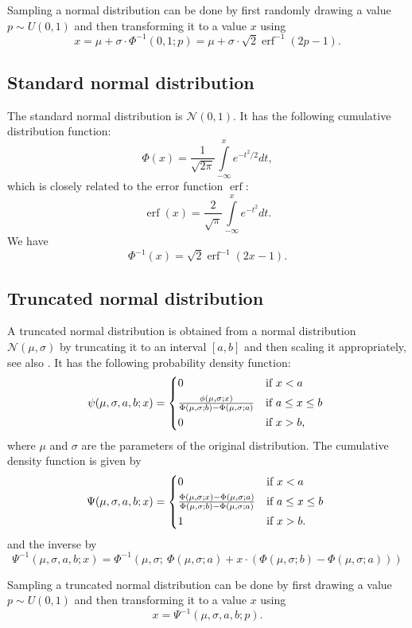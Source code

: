 \documentclass{article}
\DeclareMathOperator\erf{erf}
\begin{document}
\vspace{0.5cm}
\noindent
Sampling a normal distribution can be done by first randomly drawing a value $p \sim U(0,1)$ and then transforming it to a value $x$ using
\[
x = \mu + \sigma \cdot \Phi^{-1}(0,1; p) = \mu + \sigma \cdot \sqrt{2} \erf^{-1}(2p - 1).
\]

\subsection{Standard normal distribution}
The standard normal distribution is $\mathcal{N}(0,1)$. It has the following cumulative distribution function:
\[
\Phi(x) = \frac{1}{\sqrt{2 \pi}} 
\int\limits_{-\infty}^x e^{-t^2 / 2} dt,
\]
which is closely related to the error function $\erf$:
\[
\erf(x) = \frac{2}{\sqrt{\pi}} 
\int\limits_{-\infty}^x e^{-t^2} dt.
\]
We have
\[
\Phi^{-1}(x) = \sqrt{2} \erf^{-1}(2x-1).
\]

\subsection{Truncated normal distribution}
A truncated normal distribution is obtained from a normal distribution $\mathcal{N}(\mu,\sigma)$ by truncating it to an interval $[a,b]$ and then scaling it appropriately, see also \cite{Burkardt2014}. It has the following probability density function:
\[
\psi(\mu,\sigma,a,b;x) =
\begin{cases*}
0 & if $x < a$ \\
\frac{\phi(\mu,\sigma;x)}{\Phi(\mu,\sigma;b) - \Phi(\mu,\sigma;a)} & if $a \leq x \leq b$ \\
0 & if $x > b$,
\end{cases*}
\]
where $\mu$ and $\sigma$ are the parameters of the original distribution. The cumulative density function is given by
\[
\Psi(\mu,\sigma,a,b;x) =
\begin{cases*}
0 & if $x < a$ \\
\frac{\Phi(\mu,\sigma;x) - \Phi(\mu,\sigma;a)}{\Phi(\mu,\sigma;b) - \Phi(\mu,\sigma;a)} & if $a \leq x \leq b$ \\
1 & if $x > b$.
\end{cases*}
\]
and the inverse by
\[
\Psi^{-1}(\mu,\sigma,a,b;x) = \Phi^{-1}(\mu,\sigma; ~ \Phi(\mu,\sigma;a) + x \cdot (\Phi(\mu,\sigma;b) - \Phi(\mu,\sigma;a)))
\]

Sampling a truncated normal distribution can be done by first drawing a value $p \sim U(0,1)$ and then transforming it to a value $x$ using
\[
x = \Psi^{-1}(\mu, \sigma, a, b; p).
\]
\end{document}
